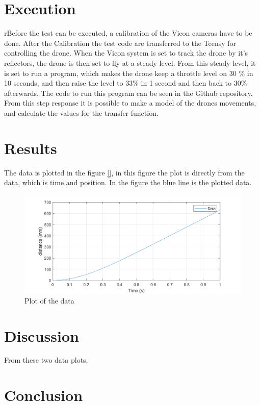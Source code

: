 \section*{Execution}
rBefore the test can be executed, a calibration of the Vicon cameras have to be done. After the Calibration the test code are transferred to the Teensy for controlling the drone. When the Vicon system is set to track the drone by it's reflectors, the drone is then set to fly at a steady level. From this steady level, it is set to run a program, which makes the drone keep a throttle level on 30 \% in 10 seconds, and then raise the level to 33\% in 1 second and then back to 30\% afterwards. The code to run this program can be seen in the Github repository. From this step response it is possible to make a model of the drones movements, and calculate the values for the transfer function. 



\section*{Results}
The data is plotted in the figure \ref{}, in this figure the plot is directly from the data, which is time and position. In the figure the blue line is the plotted data.

\begin{figure}[H]
    \centering
    \includegraphics[width=\textwidth]{figures/Appendix/measuringTest/DroneTest.png}
    \caption{Plot of the data }
    \label{fig:positiontime}
\end{figure}

\section*{Discussion}
From these two data plots,



\section*{Conclusion}
